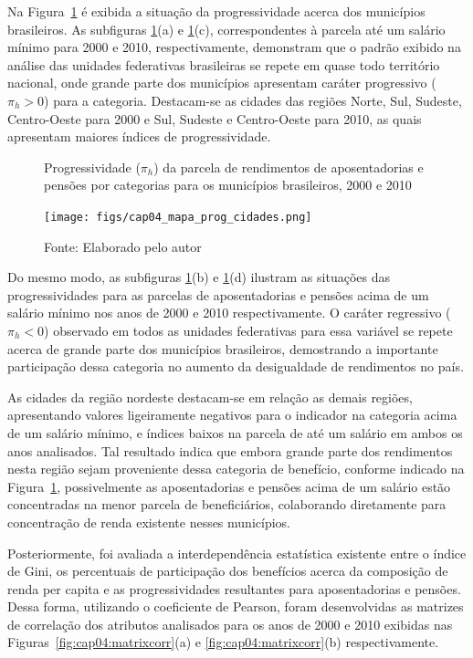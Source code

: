 Na Figura~\ref{fig:cap04:progcidades} é exibida a situação da progressividade acerca dos municípios brasileiros. As subfiguras \ref{fig:cap04:progcidades}(a) e \ref{fig:cap04:progcidades}(c), correspondentes à parcela até um salário mínimo para 2000 e 2010, respectivamente, demonstram que o padrão exibido na análise das unidades federativas brasileiras se repete em quase todo território nacional, onde grande parte dos municípios apresentam caráter progressivo ($\pi_h > 0$) para a categoria. Destacam-se as cidades das regiões Norte, Sul, Sudeste, Centro-Oeste para 2000 e Sul, Sudeste e Centro-Oeste para 2010, as quais apresentam maiores índices de progressividade.

\begin{figure}[!ht]
    \centering
    \caption{Progressividade ($\pi_h$) da parcela de rendimentos de aposentadorias e pensões por categorias para os municípios brasileiros, 2000 e 2010}
    \texttt{[image: figs/cap04\_mapa\_prog\_cidades.png]}
    \caption*{\footnotesize{Fonte: Elaborado pelo autor}}
    \label{fig:cap04:progcidades}
\end{figure}

Do mesmo modo, as subfiguras \ref{fig:cap04:progcidades}(b) e \ref{fig:cap04:progcidades}(d) ilustram as situações das progressividades para as parcelas de aposentadorias e pensões acima de um salário mínimo nos anos de 2000 e 2010 respectivamente. O caráter regressivo ($\pi_h < 0$) observado em todos as unidades federativas para essa variável se repete acerca de grande parte dos municípios brasileiros, demostrando a importante participação dessa categoria no aumento da desigualdade de rendimentos no país.

As cidades da região nordeste destacam-se em relação as demais regiões, apresentando valores ligeiramente negativos para o indicador na categoria acima de um salário mínimo, e índices baixos na parcela de até um salário em ambos os anos analisados. Tal resultado indica que embora grande parte dos rendimentos nesta região sejam proveniente dessa categoria de benefício, conforme indicado na Figura~\ref{fig:cap04:progcidades}, possivelmente as aposentadorias e pensões acima de um salário estão concentradas na menor parcela de beneficiários, colaborando diretamente para concentração de renda existente nesses municípios. 

Posteriormente, foi avaliada a interdependência estatística existente entre o índice de Gini, os percentuais de participação dos benefícios acerca da composição de renda per capita e as progressividades resultantes para aposentadorias e pensões. Dessa forma, utilizando o coeficiente de Pearson, foram desenvolvidas as matrizes de correlação dos atributos analisados para os anos de 2000 e 2010 exibidas nas Figuras~\ref{fig:cap04:matrixcorr}(a) e \ref{fig:cap04:matrixcorr}(b) respectivamente.


